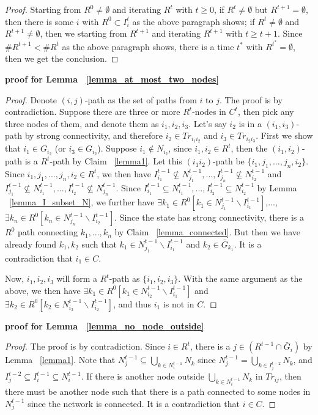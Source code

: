 \documentclass[12pt,letter]{article}
\theoremstyle{definition}
\theoremstyle{remark}
\theoremstyle{claim}
\begin{document}
\begin{proof}
Starting from $R^0\neq \emptyset$ and iterating $R^t$ with $t\geq 0$, if $R^t\neq \emptyset$ but $R^{t+1}= \emptyset$, then there is some $i$ with $R^0\subset I^t_i$ as the above paragraph shows; if $R^t\neq \emptyset$ and $R^{t+1}\neq \emptyset$, then we starting from $R^{t+1}$ and iterating $R^{t+1}$ with $t\geq t+1$. Since $\#R^{t+1}<\#R^t$ as the above paragraph shows, there is a time $t^{*}$ with $R^{t^{*}}=\emptyset$, then we get the conclusion.


\end{proof}




\textbf{proof for Lemma ~\ref{lemma_at_most_two_nodes}}

\begin{proof}
Denote $(i,j)$-path as the set of paths from $i$ to $j$. The proof is by contradiction. Suppose there are three or more $R^t$-nodes in $C^t$, then pick any three nodes of them, and denote them as $i_1,i_2,i_3$. Let's say $i_2$ is in a $(i_1,i_3)$-path by strong connectivity, and therefore $i_2\in Tr_{i_1i_2}$ and $i_3\in Tr_{i_2i_3}$. First we show that $i_1\in G_{i_2}$ (or $i_3\in G_{i_2}$). Suppose $i_1\notin N_{i_2}$, since $i_1,i_2\in R^t$, then the $(i_1,i_2)$-path is a $R^t$-path by Claim ~\ref{lemma1}. Let this $(i_1i_2)$-path be $\{i_1,j_1,...,j_n,i_2\}$. Since $i_1,j_1,...,j_n,i_2\in R^t$, we then have $I^{t-1}_{i_1}\nsubseteq N^{t-1}_{j_1},...,I^{t-1}_{j_n}\nsubseteq N^{t-1}_{i_2}$ and $I^{t-1}_{j_1}\nsubseteq N^{t-1}_{i_1},...,I^{t-1}_{i_2}\nsubseteq N^{t-1}_{j_n}$. Since $I^{t-1}_{i_1}\subseteq N^{t-1}_{i_1},...,I^{t-1}_{i_2}\subseteq N^{t-1}_{i_2}$ by Lemma ~\ref{lemma_I_subset_N}, we further have $\exists k_1\in R^0[k_1\in N^{t-1}_{j_1}\backslash I^{t-1}_{i_1}]$,...,$\exists k_n\in R^0[k_n\in N^{t-1}_{j_n}\backslash I^{t-1}_{i_2}]$. Since the state has strong connectivity, there is a $R^0$ path connecting $k_1,...,k_n$ by Claim ~\ref{lemma_connected}. But then we have already found $k_1,k_2$ such that $k_1\in N^{t-1}_{j_1}\backslash I^{t-1}_{i_1}$ and $k_2\in \bar{G}_{k_1}$. It is a contradiction that $i_1\in C$.

Now, $i_1,i_2,i_3$ will form a $R^t$-path as $\{i_1,i_2,i_3\}$. With the same argument as the above, we then have $\exists k_1\in R^0[k_1\in N^{t-1}_{i_2}\backslash I^{t-1}_{i_1}]$ and $\exists k_2\in R^0[k_2\in N^{t-1}_{i_3}\backslash I^{t-1}_{i_2}]$, and thus $i_1$ is not in $C$.
\end{proof}


\textbf{proof for Lemma ~\ref{lemma_no_node_outside}}
\begin{proof}
The proof is by contradiction. Since $i\in R^t$, there is a $j\in (R^{t-1}\cap \bar{G}_i)$ by Lemma ~\ref{lemma1}. Note that $N^{t-1}_j\subseteq \bigcup_{k\in N^{t-1}_i}N_k$ since $N^{t-1}_j =\bigcup_{k\in I^{t-2}_j}N_k$, and $I^{t-2}_j\subseteq I^{t-1}_i\subseteq N^{t-1}_i$. If there is another node outside $\bigcup_{k\in N^{t-1}_i}N_k$ in $Tr_{ij}$, then there must be another node such that there is a path connected to some nodes in $N^{t-1}_j$ since the network is connected. It is a contradiction that $i\in C$.

\end{proof}
\end{document}
